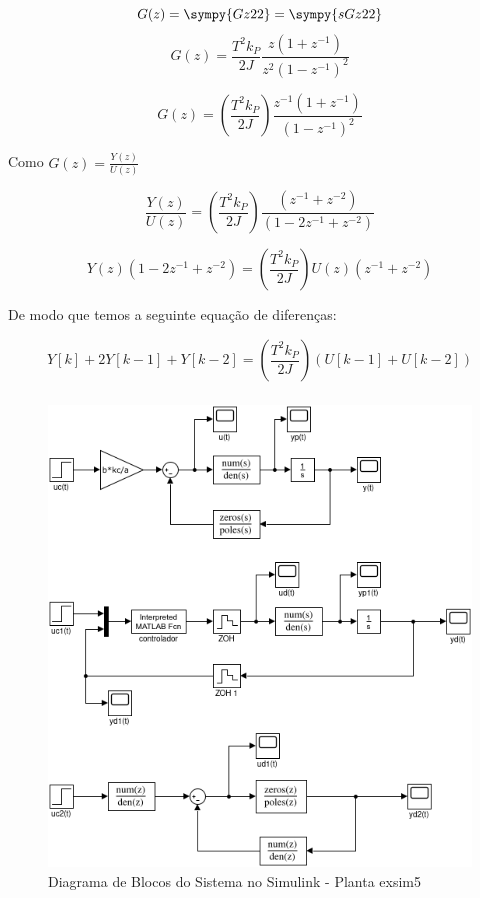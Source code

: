 \documentclass[a4paper,11pt]{article}
\begin{document}
$$G(z) = \sympy{Gz22} = \sympy{sGz22}$$
$$G(z) = \frac{T^2 k_{P}}{2J}\frac{z(1+z^{-1})}{z^2(1-z^{-1})^2}$$

\begin{equation}
    G(z) =\left(\frac{T^2 k_{P}}{2J}\right)\frac{z^{-1}(1+z^{-1})}{(1-z^{-1})^2}
\end{equation}

Como $G(z) = \frac{Y(z)}{U(z)}$

$$
\frac{Y(z)}{U(z)} =\left(\frac{T^2 k_{P}}{2J}\right)\frac{(z^{-1} + z^{-2})}{(1 - 2 z^{-1} + z^{-2})}
$$

$$
 Y(z)\left(1 - 2 z^{-1} + z^{-2}\right)
 = \left(\frac{T^2 k_{P}}{2J}\right)U(z)\left(z^{-1} + z^{-2}\right)
$$

De modo que temos a seguinte equação de diferenças:

\begin{equation}
 Y[k] +  2Y[k -1] +  Y[k - 2]
 = \left(\frac{T^2 k_{P}}{2J}\right)\left(U[k -1] +  U[k - 2]\right)
\end{equation}

\subsubsection{}

\begin{figure}[H]
    \centering
    \includegraphics[width=0.9\linewidth]{img/exsim5model.png}
    \caption{Diagrama de Blocos do Sistema no Simulink - Planta exsim5}
\end{figure}
\end{document}
